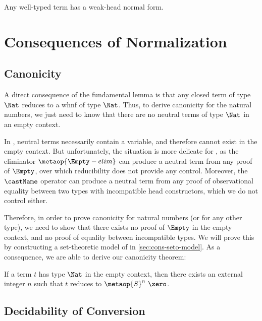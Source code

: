 \begin{corollary}[Normalization]
  Any well-typed term has a weak-head normal form.
\end{corollary}

\section{Consequences of Normalization}
\label{sec:normalization-consequences}

\subsection{Canonicity}

A direct consequence of the fundamental lemma is that any closed
term of type $\Nat$ reduces to a whnf of type $\Nat$. Thus, to
derive canonicity for the natural numbers, we just need to know that there are
no neutral terms of type $\Nat$ in an empty context.

In \MLTT, neutral terms necessarily contain a variable, and therefore cannot 
exist in the empty context. 
% 
But unfortunately, the situation is more delicate for \SetoidCC, as
the eliminator \( \metaop{\Empty-elim} \) can produce a neutral term from any 
proof of \( \Empty \), over which reducibility does not provide any control.
% 
Moreover, the \( \castName \) operator can produce a neutral term from any
proof of observational equality between two types with incompatible head 
constructors, which we do not control either.

Therefore, in order to prove canonicity for natural numbers (or for any other 
type), we need to show that there exists no proof of \( \Empty \) in the empty
context, and no proof of equality between incompatible types.
%
We will prove this by constructing a set-theoretic model of \SetoidCC in 
\cref{sec:cons-seto-model}. As a consequence, we are able to derive our 
canonicity theorem:

\begin{theorem}
	If a term \( t \) has type \( \Nat \) in the empty context, then there 
	exists an external integer \( n \) such that \( t \) reduces to 
  \( \metaop{S}^n\ \zero \).
\end{theorem}

\subsection{Decidability of Conversion}

